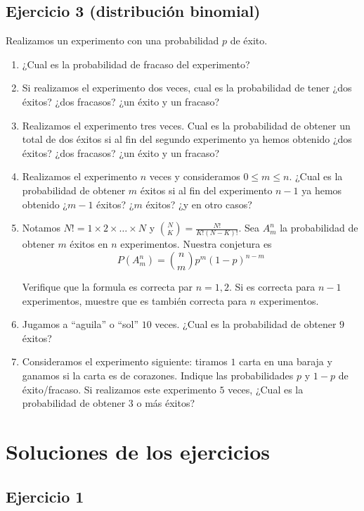 \subsection{Ejercicio 3 (distribución binomial)}

Realizamos un experimento con una probabilidad $p$ de éxito.

\begin{enumerate}
  \item ¿Cual es la probabilidad de fracaso del experimento?
  \item Si realizamos el experimento dos veces, cual es la probabilidad
    de tener ¿dos éxitos? ¿dos fracasos? ¿un éxito y un fracaso?
  \item Realizamos el experimento tres veces. Cual es la probabilidad de
    obtener un total de dos éxitos si al fin del segundo experimento ya hemos
    obtenido ¿dos éxitos? ¿dos fracasos? ¿un éxito y un fracaso?
  \item Realizamos el experimento $n$ veces y consideramos $0 \leq m \leq n$.
    ¿Cual es la probabilidad de obtener $m$ éxitos si al fin del
    experimento $n-1$ ya hemos obtenido ¿$m-1$ éxitos? ¿$m$ éxitos? ¿y en 
    otro casos?
  \item Notamos $N! = 1 \times 2 \times \ldots \times N$ y
    $\binom{N}{K} = \frac{N!}{{K!}{(N-K)!}}$. Sea $A_m^n$ la probabilidad
    de obtener $m$ éxitos en $n$ experimentos. Nuestra conjetura es
    $$
    P(A_m^n) = \binom{n}{m} p^m \left(1-p\right)^{n-m}
    $$
   
    Verifique que la formula es correcta par $n = 1, 2$. Si es correcta para
    $n-1$ experimentos, muestre que es también correcta para $n$
    experimentos.
  \item Jugamos a ``aguila'' o ``sol'' $10$ veces. ¿Cual es la probabilidad
    de obtener $9$ éxitos?
  \item Consideramos el experimento siguiente: tiramos $1$ carta en una baraja
    y ganamos si la carta es de corazones. Indique las probabilidades $p$ y
    $1-p$ de éxito/fracaso. Si realizamos este experimento $5$ veces,
    ¿Cual es la probabilidad de obtener $3$ o más éxitos?
\end{enumerate}


\section{Soluciones de los ejercicios}

\subsection{Ejercicio 1}

